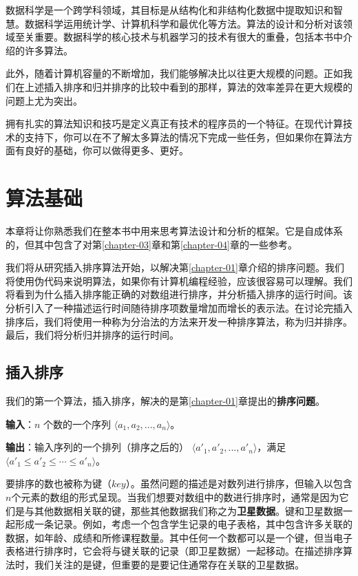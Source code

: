 \documentclass[lang=cn,newtx,10pt,scheme=chinese]{elegantbook}
\begin{document}
数据科学是一个跨学科领域，其目标是从结构化和非结构化数据中提取知识和智慧。数据科学运用统计学、计算机科学和最优化等方法。算法的设计和分析对该领域至关重要。数据科学的核心技术与机器学习的技术有很大的重叠，包括本书中介绍的许多算法。

此外，随着计算机容量的不断增加，我们能够解决比以往更大规模的问题。正如我们在上述插入排序和归并排序的比较中看到的那样，算法的效率差异在更大规模的问题上尤为突出。

拥有扎实的算法知识和技巧是定义真正有技术的程序员的一个特征。在现代计算技术的支持下，你可以在不了解太多算法的情况下完成一些任务，但如果你在算法方面有良好的基础，你可以做得更多、更好。

\chapter{算法基础}\label{chapter-02}

本章将让你熟悉我们在整本书中用来思考算法设计和分析的框架。它是自成体系的，但其中包含了对第\ref{chapter-03}章和第\ref{chapter-04}章的一些参考。

我们将从研究插入排序算法开始，以解决第\ref{chapter-01}章介绍的排序问题。我们将使用伪代码来说明算法，如果你有计算机编程经验，应该很容易可以理解。我们将看到为什么插入排序能正确的对数组进行排序，并分析插入排序的运行时间。该分析引入了一种描述运行时间随待排序项数量增加而增长的表示法。在讨论完插入排序后，我们将使用一种称为分治法的方法来开发一种排序算法，称为归并排序。最后，我们将分析归并排序的运行时间。

\section{插入排序}\label{section-2.1}

我们的第一个算法，插入排序，解决的是第\ref{chapter-01}章提出的\textbf{排序问题}。

\textbf{输入}：$n$ 个数的一个序列 $\langle a_1, a_2, ..., a_n\rangle$。

\textbf{输出}：输入序列的一个排列（排序之后的） $\langle{a'_1,a'_2,...,a'_n}\rangle$，满足$\langle{a'_1\le a'_2\le \cdots\le a'_n}\rangle$。

要排序的数也被称为键（$key$）。虽然问题的描述是对数列进行排序，但输入以包含$n$个元素的数组的形式呈现。当我们想要对数组中的数进行排序时，通常是因为它们是与其他数据相关联的键，那些其他数据我们称之为\textbf{卫星数据}。键和卫星数据一起形成一条记录。例如，考虑一个包含学生记录的电子表格，其中包含许多关联的数据，如年龄、成绩和所修课程数量。其中任何一个数都可以是一个键，但当电子表格进行排序时，它会将与键关联的记录（即卫星数据）一起移动。在描述排序算法时，我们关注的是键，但重要的是要记住通常存在关联的卫星数据。
\end{document}

